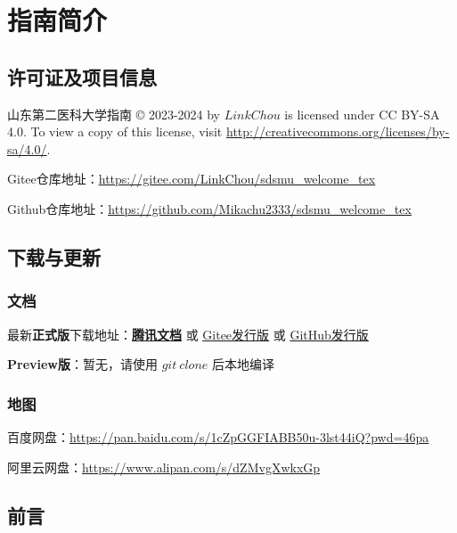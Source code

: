 \chapter[指南简介]{指南简介}

\section[许可证及项目信息]{许可证及项目信息}
山东第二医科大学指南 © 2023-2024 by $LinkChou$ is licensed under CC BY-SA 4.0. To view a copy of this license, visit \uline{\href{http://creativecommons.org/licenses/by-sa/4.0/}{http://creativecommons.org/licenses/by-sa/4.0/}}.

Gitee仓库地址：\uline{\href{https://gitee.com/LinkChou/sdsmu_welcome_tex}{https://gitee.com/LinkChou/sdsmu\_welcome\_tex}}

Github仓库地址：\uline{\href{https://github.com/Mikachu2333/sdsmu_welcome_tex}{https://github.com/Mikachu2333/sdsmu\_welcome\_tex}}

\section[\textcolor{red}{下载与更新}]{下载与更新}
\subsection{文档}
最新\textbf{正式版}下载地址：\textbf{\uline{\textcolor{red}{\href{https://docs.qq.com/s/ETcQ-ZFSrSsh6MK9bm773q}{腾讯文档}}}} 或 \uline{\href{https://gitee.com/LinkChou/sdsmu_welcome_tex/releases/latest}{Gitee发行版}} 或 \uline{\href{https://github.com/mikachu2333/sdsmu_welcome_tex/releases/latest}{GitHub发行版}}

\textbf{Preview版}\footnotemark：暂无，请使用 $git\ clone$ 后本地编译

\subsection[地图]{地图}
百度网盘：\uline{\href{https://pan.baidu.com/s/1cZpGGFIABB50u-3lst44iQ?pwd=46pa}{https://pan.baidu.com/s/1cZpGGFIABB50u-3lst44iQ?pwd=46pa}}

阿里云网盘：\uline{\href{https://www.alipan.com/s/dZMvgXwkxGp}{https://www.alipan.com/s/dZMvgXwkxGp}}

\section[前言]{前言}
